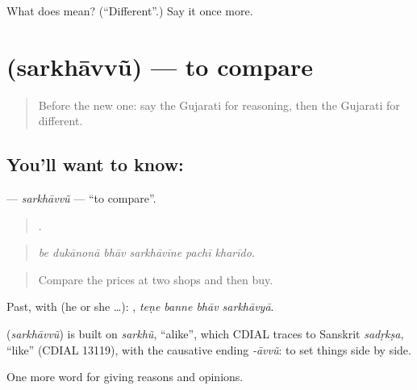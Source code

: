 \begin{tcolorbox}[breakable,colback=teal!4,colframe=teal!35!black,title={Before you move on}]
What does  mean? (\textquotedblleft{}Different\textquotedblright{}.) Say it once more.
\end{tcolorbox}
\section[\texorpdfstring{\gu{સરખાવવું} (sarkhāvvũ)}{સરખાવવું (sarkhāvvũ)}]{ (sarkhāvvũ) — to compare}

\label{lesson:GU-C346-sarkhavvu}



\begin{quote}
Before the new one: say the Gujarati for reasoning, then the Gujarati for different.
\end{quote}

\subsection*{You'll want to know: }
\textbf{} — \emph{sarkhāvvũ} — \textquotedblleft{}to compare\textquotedblright{}.

\begin{quote}
     .
\end{quote}

\begin{quote}
\emph{be dukānonā bhāv sarkhāvīne pachī kharīdo.}
\end{quote}

\begin{quote}
Compare the prices at two shops and then buy.
\end{quote}

Past, with  (he or she …):    , \emph{teṇe banne bhāv sarkhāvyā}.

\begin{cousinweb}
\textbf{} (\emph{sarkhāvvũ}) is built on \emph{sarkhũ}, \textquotedblleft{}alike\textquotedblright{}, which CDIAL traces to Sanskrit \emph{sadṛkṣa}, \textquotedblleft{}like\textquotedblright{} (CDIAL 13119), with the causative ending \emph{-āvvũ}: to set things side by side.
\end{cousinweb}

\begin{grammarlens}[title={What you've built}]
One more word for giving reasons and opinions.
\end{grammarlens}

